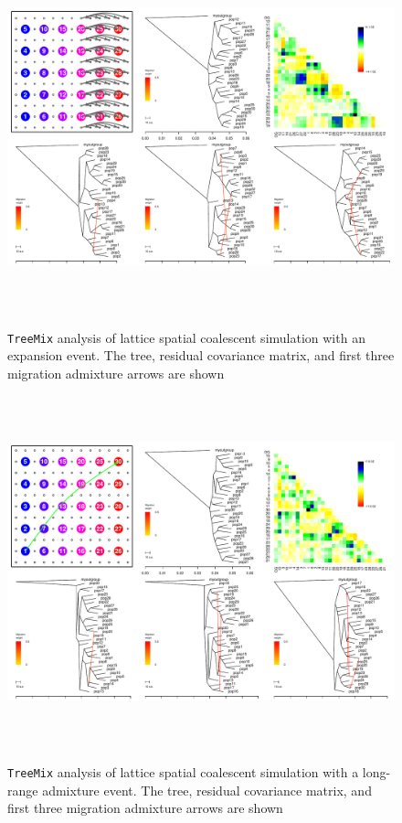 \documentclass[10pt,letterpaper]{article}
\begin{document}
\begin{figure}
	\centering
		{\includegraphics[width=6in,height=4in]{../figs/sims/Treemix_comparison/ms_dataset_expansiontreemix_fig_sequential.pdf}}
	\caption{\texttt{TreeMix} analysis of lattice spatial coalescent simulation with an expansion event.  The tree, residual covariance matrix, and first three migration admixture arrows are shown}\label{sfig:treemix_expansion}
\end{figure}

\begin{figure}
	\centering
		{\includegraphics[width=6in,height=4in]{../figs/sims/Treemix_comparison/ms_dataset_corner_admixturetreemix_fig_sequential.pdf}}
	\caption{\texttt{TreeMix} analysis of lattice spatial coalescent simulation with a long-range admixture event.  The tree, residual covariance matrix, and first three migration admixture arrows are shown}\label{sfig:treemix_corneradmixture}
\end{figure}
\end{document}
